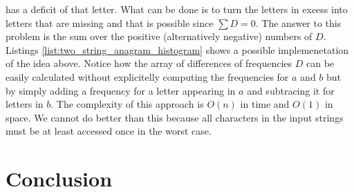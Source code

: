 has a deficit of that letter.
What can be done is to turn the letters in excess into letters that
are missing and that is possible since $\sum D = 0$.
The answer to this problem is the sum over the positive (alternatively negative) numbers of $D$. 
Listings \ref{list:two_string_anagram_histogram} shows a possible implemenetation of the idea above.
Notice how the array of differences of frequencies $D$ can be easily calculated without explicitelly
computing the frequencies for $a$ and $b$ but by simply adding a frequency for a letter appearing in $a$
and subtracing it for letters in $b$. 
The complexity of this approach is $O(n)$ in time and $O(1)$ in space. We cannot do better than this because all characters in the input strings must be at least accessed once in the worst case.

\begin{minipage}{\linewidth}
	
\end{minipage}

\section{Conclusion}